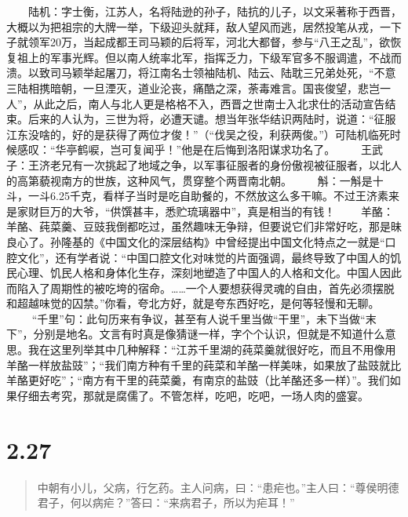 \documentclass[]{book}
\begin{document}
　　陆机：字士衡，江苏人，名将陆逊的孙子，陆抗的儿子，以文采著称于西晋，大概以为把祖宗的大牌一举，下级迎头就拜，敌人望风而逃，居然投笔从戎，一下子就领军20万，当起成都王司马颖的后将军，河北大都督，参与``八王之乱''，欲恢复祖上的军事光辉。但以南人统率北军，指挥乏力，下级军官多不服调遣，不战而溃。以致司马颖举起屠刀，将江南名士领袖陆机、陆云、陆耽三兄弟处死，``不意三陆相携暗朝，一旦湮灭，道业沦丧，痛酷之深，荼毒难言。国丧俊望，悲岂一人''，从此之后，南人与北人更是格格不入，西晋之世南士入北求仕的活动宣告结束。后来的人认为，三世为将，必遭天谴。想当年张华结识两陆时，说道：``征服江东没啥的，好的是获得了两位才俊！''（``伐吴之役，利获两俊。''）可陆机临死时候感叹：``华亭鹤唳，岂可复闻乎！''他是在后悔到洛阳谋求功名了。
　　王武子：王济老兄有一次挑起了地域之争，以军事征服者的身份傲视被征服者，以北人的高第藐视南方的世族，这种风气，贯穿整个两晋南北朝。
　　斛：一斛是十斗，一斗6.25千克，看样子当时是吃自助餐的，不然放这么多干嘛。不过王济素来是家财巨万的大爷，``供馔甚丰，悉贮琉璃器中''，真是相当的有钱！
　　羊酪：羊酪、莼菜羹、豆豉我倒都吃过，虽然趣味无争辩，但要说它们非常好吃，那是昧良心了。孙隆基的《中国文化的深层结构》中曾经提出中国文化特点之一就是``口腔文化''，还有学者说：``中国口腔文化对味觉的片面强调，最终导致了中国人的饥民心理、饥民人格和身体化生存，深刻地塑造了中国人的人格和文化。中国人因此而陷入了周期性的被吃垮的宿命。\ldots{}\ldots{}一个人要想获得灵魂的自由，首先必须摆脱和超越味觉的囚禁。''你看，夸北方好，就是夸东西好吃，是何等轻慢和无聊。
　　
``千里''句：此句历来有争议，甚至有人说千里当做``干里''，未下当做``末下''，分别是地名。文言有时真是像猜谜一样，字个个认识，但就是不知道什么意思。我在这里列举其中几种解释：``江苏千里湖的莼菜羹就很好吃，而且不用像用羊酪一样放盐豉''；``我们南方种有千里的莼菜和羊酪一样美味，如果放了盐豉就比羊酪更好吃''；``南方有干里的莼菜羹，有南京的盐豉（比羊酪还多一样）''。我们如果仔细去考究，那就是腐儒了。不管怎样，吃吧，吃吧，一场人肉的盛宴。

\section{2.27}\label{section-73}

\begin{quote}
中朝有小儿，父病，行乞药。主人问病，曰：``患疟也。''主人曰：``尊侯明德君子，何以病疟？''答曰：``来病君子，所以为疟耳！''
\end{quote}
\end{document}
